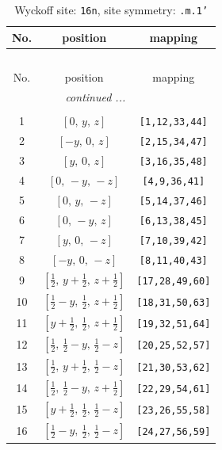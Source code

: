 \documentclass[fleqn,8pt]{jsarticle}
\begin{document}
\renewcommand{\arraystretch}{1.2}
\begin{longtable}{ccc}
\caption{Wyckoff site: {\tt 16n}, site symmetry: {\tt .m.1'}}
 \\
 \hline \hline
No. & position & mapping \\ \hline \endfirsthead

\multicolumn{2}{l}{\tablename\ \thetable{}} \\
 \hline \hline
No. & position & mapping \\ \hline \endhead

 \hline \hline
\multicolumn{2}{r}{\footnotesize\it continued ...} \\ \endfoot

 \hline \hline
\multicolumn{2}{r}{} \\ \endlastfoot

1 & $\left[ 0,\, y,\, z \right]$ & {\tt [1,12,33,44]} \\ \hline
2 & $\left[ - y,\, 0,\, z \right]$ & {\tt [2,15,34,47]} \\ \hline
3 & $\left[ y,\, 0,\, z \right]$ & {\tt [3,16,35,48]} \\ \hline
4 & $\left[ 0,\, - y,\, - z \right]$ & {\tt [4,9,36,41]} \\ \hline
5 & $\left[ 0,\, y,\, - z \right]$ & {\tt [5,14,37,46]} \\ \hline
6 & $\left[ 0,\, - y,\, z \right]$ & {\tt [6,13,38,45]} \\ \hline
7 & $\left[ y,\, 0,\, - z \right]$ & {\tt [7,10,39,42]} \\ \hline
8 & $\left[ - y,\, 0,\, - z \right]$ & {\tt [8,11,40,43]} \\ \hline
9 & $\left[ \frac{1}{2},\, y + \frac{1}{2},\, z + \frac{1}{2} \right]$ & {\tt [17,28,49,60]} \\ \hline
10 & $\left[ \frac{1}{2} - y,\, \frac{1}{2},\, z + \frac{1}{2} \right]$ & {\tt [18,31,50,63]} \\ \hline
11 & $\left[ y + \frac{1}{2},\, \frac{1}{2},\, z + \frac{1}{2} \right]$ & {\tt [19,32,51,64]} \\ \hline
12 & $\left[ \frac{1}{2},\, \frac{1}{2} - y,\, \frac{1}{2} - z \right]$ & {\tt [20,25,52,57]} \\ \hline
13 & $\left[ \frac{1}{2},\, y + \frac{1}{2},\, \frac{1}{2} - z \right]$ & {\tt [21,30,53,62]} \\ \hline
14 & $\left[ \frac{1}{2},\, \frac{1}{2} - y,\, z + \frac{1}{2} \right]$ & {\tt [22,29,54,61]} \\ \hline
15 & $\left[ y + \frac{1}{2},\, \frac{1}{2},\, \frac{1}{2} - z \right]$ & {\tt [23,26,55,58]} \\ \hline
16 & $\left[ \frac{1}{2} - y,\, \frac{1}{2},\, \frac{1}{2} - z \right]$ & {\tt [24,27,56,59]} \\
\end{longtable}
\end{document}
